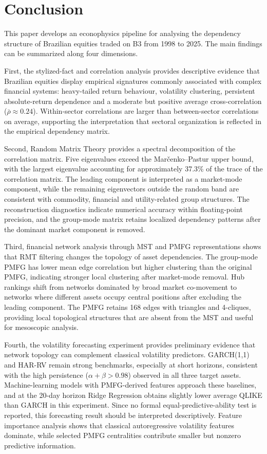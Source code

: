 \section{Conclusion}
\label{sec:conclusion}

This paper develops an econophysics pipeline for analysing the dependency structure of Brazilian equities traded on B3 from 1998 to 2025. The main findings can be summarized along four dimensions.

First, the stylized-fact and correlation analysis provides descriptive evidence that Brazilian equities display empirical signatures commonly associated with complex financial systems: heavy-tailed return behaviour, volatility clustering, persistent absolute-return dependence and a moderate but positive average cross-correlation ($\bar{\rho}\approx0.24$). Within-sector correlations are larger than between-sector correlations on average, supporting the interpretation that sectoral organization is reflected in the empirical dependency matrix.

Second, Random Matrix Theory provides a spectral decomposition of the correlation matrix. Five eigenvalues exceed the Mar\v{c}enko--Pastur upper bound, with the largest eigenvalue accounting for approximately 37.3\% of the trace of the correlation matrix. The leading component is interpreted as a market-mode component, while the remaining eigenvectors outside the random band are consistent with commodity, financial and utility-related group structures. The reconstruction diagnostics indicate numerical accuracy within floating-point precision, and the group-mode matrix retains localized dependency patterns after the dominant market component is removed.

Third, financial network analysis through MST and PMFG representations shows that RMT filtering changes the topology of asset dependencies. The group-mode PMFG has lower mean edge correlation but higher clustering than the original PMFG, indicating stronger local clustering after market-mode removal. Hub rankings shift from networks dominated by broad market co-movement to networks where different assets occupy central positions after excluding the leading component. The PMFG retains 168 edges with triangles and 4-cliques, providing local topological structures that are absent from the MST and useful for mesoscopic analysis.

Fourth, the volatility forecasting experiment provides preliminary evidence that network topology can complement classical volatility predictors. GARCH(1,1) and HAR-RV remain strong benchmarks, especially at short horizons, consistent with the high persistence ($\alpha+\beta>0.98$) observed in all three target assets. Machine-learning models with PMFG-derived features approach these baselines, and at the 20-day horizon Ridge Regression obtains slightly lower average QLIKE than GARCH in this experiment. Since no formal equal-predictive-ability test is reported, this forecasting result should be interpreted descriptively. Feature importance analysis shows that classical autoregressive volatility features dominate, while selected PMFG centralities contribute smaller but nonzero predictive information.

